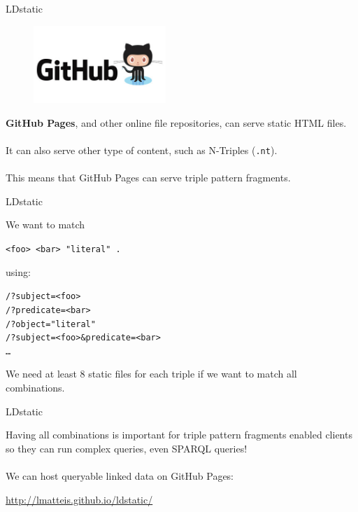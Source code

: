 \documentclass[20pt]{extarticle}
\begin{document}
{\newpage

\begin{center}
{\fontsize{35}{35}\color{blue} \sc LDstatic}
\end{center}
\begin{figure}[ht!]

\includegraphics[width=50mm]{GitHub.jpg}
\end{figure}
\vspace{5 mm}
{\fontsize{30}{30} {\cmr 
\noindent \textbf{GitHub Pages}, and other online file repositories, can serve static HTML files.
\\ \\
It can also serve other type of content, such as N-Triples (\texttt{.nt}).
\\ \\
This means that GitHub Pages can serve triple pattern fragments.
}} 


\newpage

\begin{center}
{\fontsize{35}{35}\color{blue} \sc LDstatic}
\end{center}
\vspace{10 mm}
{\fontsize{30}{30} {\cmr 
\noindent We want to match}}
\begin{alltt}
\texttt{<foo> <bar> "literal" .}
\end{alltt}
{\fontsize{30}{30} {\cmr using:}}
\begin{alltt}
/?subject=<foo>
/?predicate=<bar>
/?object="literal"
/?subject=<foo>\&predicate=<bar>
\dots
\end{alltt}
{\fontsize{30}{30} {\cmr We need at least 8 static files for each triple if we want to match all combinations.
}} 

\newpage

\begin{center}
{\fontsize{35}{35}\color{blue} \sc LDstatic}
\end{center}
\vspace{10 mm}
{\fontsize{30}{30} {\cmr 
\noindent Having all combinations is important for triple pattern fragments enabled clients so they can run complex queries, even SPARQL queries!
\\\\
We can host queryable linked data on GitHub Pages:
\begin{center}
\url{http://lmatteis.github.io/ldstatic/}
\end{center}
}} 



}
\end{document}
